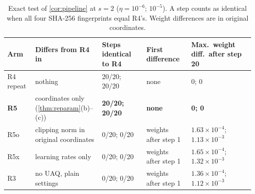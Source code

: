 \begin{table}[t]
\centering\footnotesize
\begin{tabularx}{\linewidth}{@{}l L l L l@{}}
\toprule
Arm & Differs from R4 in & Steps identical to R4 & First difference & Max.\ weight diff.\ after step 20\\
\midrule
R4 repeat & nothing & 20/20; 20/20 & none & 0; 0\\
\textbf{R5} & coordinates only (\cref{thm:reparam}(b)--(c)) & \textbf{20/20; 20/20} & \textbf{none} & \textbf{0; 0}\\
\midrule
R5o & clipping norm in original coordinates & 0/20; 0/20 & weights after step 1 & $1.63\times10^{-4}$; $1.13\times10^{-3}$\\
R5x & learning rates only & 0/20; 0/20 & weights after step 1 & $1.65\times10^{-4}$; $1.32\times10^{-3}$\\
R3 & no UAQ, plain settings & 0/20; 0/20 & weights after step 1 & $1.36\times10^{-4}$; $1.12\times10^{-3}$\\
\bottomrule
\end{tabularx}
\caption{Exact test of \cref{cor:pipeline} at $s=2$ ($\eta=10^{-6}$; $10^{-5}$). A step counts as identical when all four SHA-256 fingerprints equal R4's. Weight differences are in original coordinates.}\label{tab:s2}
\end{table}

